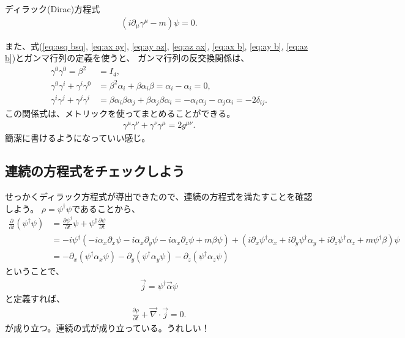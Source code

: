 \documentclass[10pt,a4paper]{jarticle}
\begin{document}
\begin{itembox}[l]{ディラック(Dirac)方程式}
\begin{align}
(i\partial_\mu \gamma^\mu - m )\psi = 0. \label{eq:dirac equation 2}
\end{align}
\end{itembox}
%
また、式(\ref{eq:asq bsq}, \ref{eq:ax ay}, \ref{eq:ay az}, \ref{eq:az ax}, \ref{eq:ax b}, \ref{eq:ay b}, \ref{eq:az b})とガンマ行列の定義を使うと、
ガンマ行列の反交換関係は、
\begin{align}
\gamma^0 \gamma^0 = \beta^2 &= I_4, \\
\gamma^0 \gamma^i + \gamma^i \gamma^0 &= \beta^2 \alpha_i + \beta \alpha_i \beta = \alpha_i - \alpha_i = 0,\\
\gamma^i \gamma^j + \gamma^j \gamma^i &= \beta \alpha_i \beta \alpha_j + \beta \alpha_j \beta \alpha_i = -\alpha_i \alpha_j - \alpha_j \alpha_i = - 2\delta_{ij}.
\end{align}
この関係式は、メトリックを使ってまとめることができる。
\begin{align}
\gamma^\mu \gamma^\nu + \gamma^\nu \gamma^\mu = 2g^{\mu\nu}. \label{eq:dirac matrix anticommut}
\end{align}
簡潔に書けるようになっていい感じ。



\subsection{連続の方程式をチェックしよう}
せっかくディラック方程式が導出できたので、連続の方程式を満たすことを確認しよう。
$\rho = \psi^\dagger \psi$であることから、
\begin{align}
\frac{\partial}{\partial t} (\psi^\dagger \psi)
&= \frac{\partial\psi^\dagger}{\partial t}\psi + \psi^\dagger \frac{\partial\psi}{\partial t} \nonumber\\
&= -i \psi^\dagger ( -i\alpha_x \partial_x \psi -i\alpha_x \partial_y \psi -i\alpha_x \partial_z \psi +  m\beta \psi)
+ ( i \partial_x \psi^\dagger \alpha_x + i \partial_y \psi^\dagger \alpha_y + i \partial_z \psi^\dagger \alpha_z + m \psi^\dagger \beta) \psi \nonumber\\
&=
- \partial_x ( \psi^\dagger \alpha_x \psi )
- \partial_y ( \psi^\dagger \alpha_y \psi )
- \partial_z ( \psi^\dagger \alpha_z \psi )
\end{align}
%
ということで、
\begin{align}
\vec j = \psi^\dagger \vec\alpha \psi
\end{align}
と定義すれば、
\begin{align}
\frac{\partial\rho}{\partial t} + \vec\nabla \cdot \vec j = 0.
\end{align}
が成り立つ。連続の式が成り立っている。うれしい！
\end{document}
